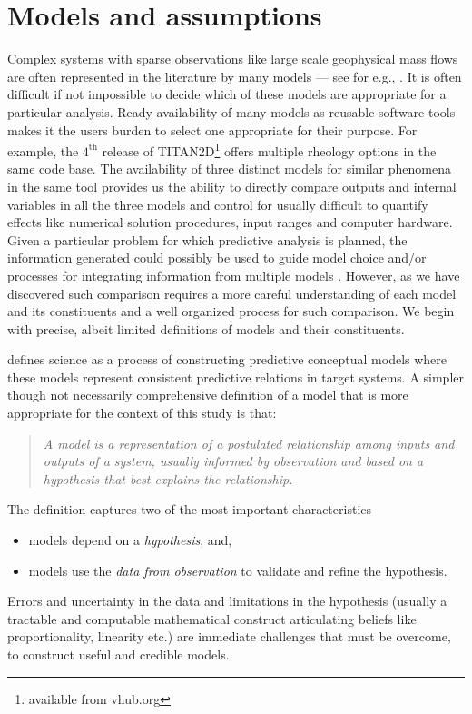 \documentclass{article}
\begin{document}
\section{Models and assumptions}

Complex systems with sparse observations like large scale geophysical mass flows are often represented in the literature by many models --- see for e.g., \cite{Kelfoun2011}. It is often difficult if not impossible to decide which of these models are appropriate for a particular analysis. Ready availability of many models as reusable software tools makes it the users burden to select one appropriate for their purpose.
For example, the $\mathrm{4^{\mathrm{th}}}$ release of TITAN2D\footnote{available from vhub.org} offers multiple rheology options in the same code base. The availability of three distinct models for similar phenomena in the same tool provides us the ability to directly compare  outputs and internal variables in all the three models and control for usually difficult to quantify effects like numerical solution procedures, input ranges and computer hardware. Given a particular problem for which predictive analysis is planned, the information generated  could possibly be used to guide model choice and/or processes for integrating information from multiple models \cite{Bongard2007}. However, as we have discovered such comparison requires a more careful understanding of each model and its constituents and a well organized process for such comparison. We begin with precise, albeit limited definitions
of models and their constituents.


\citep{Gilbert91} defines science as a process of constructing predictive conceptual models where these models represent
consistent predictive relations in target systems. A simpler though not necessarily comprehensive definition of a model that is more appropriate for the context of this study is that:

\begin{quote}{\it A model is a representation of a postulated relationship among inputs and outputs of a system, usually informed by observation and based on a hypothesis that best explains the relationship.}\end{quote} The definition captures two of the most important characteristics
\begin{itemize}
\item models depend on a {\it hypothesis}, and,
\item models use the {\it data from observation} to validate and refine the hypothesis.
\end{itemize}
Errors and uncertainty in the data and limitations in the hypothesis (usually a tractable and computable mathematical construct articulating beliefs like proportionality, linearity etc.) are immediate challenges that must be overcome, to construct useful and credible models.
\end{document}
